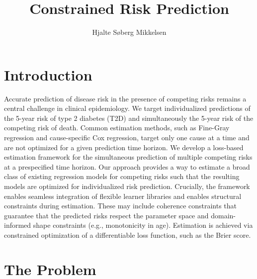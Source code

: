 \documentclass{article}
\author{Hjalte Søberg Mikkelsen}
\affil{Steno Diabetes Center Copenhagen}
\date{}
\title{Constrained Risk Prediction}
\begin{document}
\maketitle
\newpage

\section*{Introduction}
\label{sec:org69a099e}

Accurate prediction of disease risk in the presence of competing risks remains a central challenge in clinical epidemiology. We target individualized predictions of the 5-year risk of type 2 diabetes (T2D) and simultaneously the 5-year risk of the competing risk of death. Common estimation methods, such as Fine-Gray regression and cause-specific Cox regression, target only one cause at a time and are not optimized for a given prediction time horizon.
We develop a loss-based estimation framework for the simultaneous prediction of multiple competing risks at a prespecified time horizon. Our approach provides a way to estimate a broad class of existing regression models for competing risks such that the resulting models are optimized for individualized risk prediction. Crucially, the framework enables seamless integration of flexible learner libraries and enables structural constraints during estimation. These may include coherence constraints that guarantee that the predicted risks respect the parameter space and domain-informed shape constraints (e.g., monotonicity in age). Estimation is achieved via constrained optimization of a differentiable loss function, such as the Brier score.


\section*{The Problem}
\label{sec:org0080255}
\end{document}
